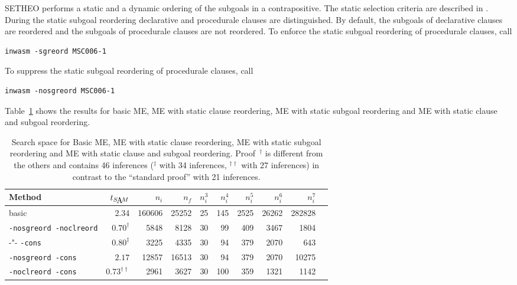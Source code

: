 SE\-THEO performs a static and a dynamic ordering of the subgoals in
a contrapositive. 
The static selection criteria are described in \cite{LSBB92}.
During the static subgoal reordering declarative and procedurale
clauses are distinguished. By default, the subgoals of declarative
clauses are reordered and the subgoals of procedurale clauses are not
reordered. To enforce the static subgoal reordering of procedurale
clauses, call
\begin{center}
\begin{verbatim}
inwasm -sgreord MSC006-1
\end{verbatim}
\end{center}
To suppress the static subgoal reordering of procedurale clauses, call
\begin{center}
\begin{verbatim}
inwasm -nosgreord MSC006-1
\end{verbatim}
\end{center}

Table~\ref{tab:tut2:results.static-reord} shows the results for basic
ME, ME with static clause reordering, ME with static subgoal
reordering and ME with static clause and subgoal reordering.

\begin{table}[htb]
\begin{center}
\begin{tabular}{|l|r|r|r||r||r|r|r|r|r|}
\hline
Method & $t_{\SAM}$ & $n_i$ & $n_f$ & 
	$n_i^3$ & $n_i^4$ & $n_i^5$ & $n_i^6$ & $n_i^7$ \\
\hline\hline
basic & 2.34 & 160606 & 25252 &
	25 & 145 & 2525 & 26262 & 282828 \\
\hline
{\tt -nosgreord -noclreord} & $0.70^\dagger$ & 5848 & 8128 &
	30 & 99 & 409 & 3467 & 1804 \\
\hline
-"- {\tt -cons} & $0.80^\ddagger$ & 3225 & 4335 &
	30 & 94 & 379 & 2070 & 643 \\
\hline
{\tt -nosgreord -cons} & $2.17$ & 12857 & 16513 &
	30 & 94 & 379 & 2070 & 10275 \\
\hline
{\tt -noclreord -cons} & $0.73^{\dagger\dagger}$ & 2961 & 3627 &
	30 & 100 & 359 & 1321 & 1142 \\
\hline\hline
\end{tabular}
\end{center}
\caption{Search space for Basic ME, ME with static clause reordering,
         ME with static subgoal reordering and ME with static clause
         and subgoal reordering.
	Proof~$^\dagger$ is different from the others and 
	contains 46 inferences ($^\ddagger$ with 34 inferences,
	$^{\dagger\dagger}$ with 27 inferences)
	in contrast to the ``standard proof'' with 21 inferences.} 
\label{tab:tut2:results.static-reord}
\end{table}

